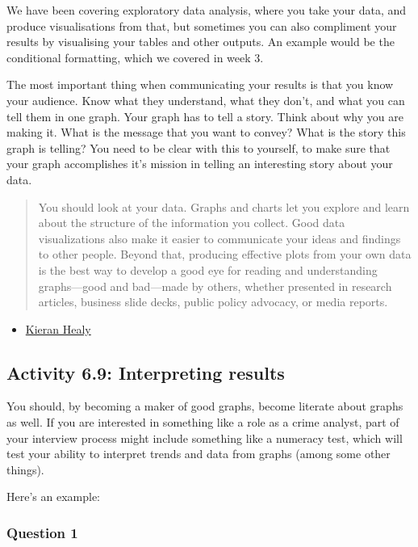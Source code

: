 \documentclass[
]{book}
\providecommand{\tightlist}{%
  \setlength{\itemsep}{0pt}\setlength{\parskip}{0pt}}
\begin{document}
We have been covering exploratory data analysis, where you take your data, and produce visualisations from that, but sometimes you can also compliment your results by visualising your tables and other outputs. An example would be the conditional formatting, which we covered in week 3.

The most important thing when communicating your results is that you know your audience. Know what they understand, what they don't, and what you can tell them in one graph. Your graph has to tell a story. Think about why you are making it. What is the message that you want to convey? What is the story this graph is telling? You need to be clear with this to yourself, to make sure that your graph accomplishes it's mission in telling an interesting story about your data.

\begin{quote}
You should look at your data. Graphs and charts let you explore and learn about the structure of the information you collect. Good data visualizations also make it easier to communicate your ideas and findings to other people. Beyond that, producing effective plots from your own data is the best way to develop a good eye for reading and understanding graphs---good and bad---made by others, whether presented in research articles, business slide decks, public policy advocacy, or media reports.
\end{quote}

\begin{itemize}
\tightlist
\item
  \href{http://socviz.co/}{Kieran Healy}
\end{itemize}

\hypertarget{activity-6.9-interpreting-results}{%
\subsection{Activity 6.9: Interpreting results}\label{activity-6.9-interpreting-results}}

You should, by becoming a maker of good graphs, become literate about graphs as well. If you are interested in something like a role as a crime analyst, part of your interview process might include something like a numeracy test, which will test your ability to interpret trends and data from graphs (among some other things).

Here's an example:

\hypertarget{question-1}{%
\subsubsection*{Question 1}\label{question-1}}
\end{document}

